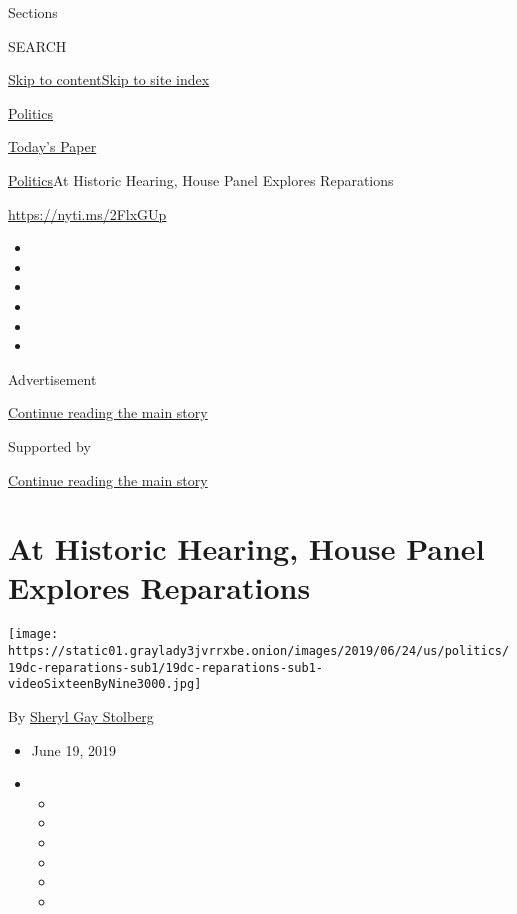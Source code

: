 Sections

SEARCH

\protect\hyperlink{site-content}{Skip to
content}\protect\hyperlink{site-index}{Skip to site index}

\href{https://www.nytimes3xbfgragh.onion/section/politics}{Politics}

\href{https://myaccount.nytimes3xbfgragh.onion/auth/login?response_type=cookie\&client_id=vi}{}

\href{https://www.nytimes3xbfgragh.onion/section/todayspaper}{Today's
Paper}

\href{/section/politics}{Politics}\textbar{}At Historic Hearing, House
Panel Explores Reparations

\url{https://nyti.ms/2FlxGUp}

\begin{itemize}
\item
\item
\item
\item
\item
\item
\end{itemize}

Advertisement

\protect\hyperlink{after-top}{Continue reading the main story}

Supported by

\protect\hyperlink{after-sponsor}{Continue reading the main story}

\hypertarget{at-historic-hearing-house-panel-explores-reparations}{%
\section{At Historic Hearing, House Panel Explores
Reparations}\label{at-historic-hearing-house-panel-explores-reparations}}

\texttt{[image: https://static01.graylady3jvrrxbe.onion/images/2019/06/24/us/politics/19dc-reparations-sub1/19dc-reparations-sub1-videoSixteenByNine3000.jpg]}

By
\href{https://www.nytimes3xbfgragh.onion/by/sheryl-gay-stolberg}{Sheryl
Gay Stolberg}

\begin{itemize}
\item
  June 19, 2019
\item
  \begin{itemize}
  \item
  \item
  \item
  \item
  \item
  \item
  \end{itemize}
\end{itemize}

